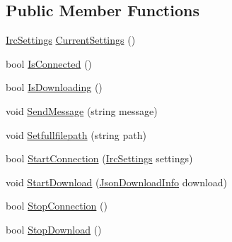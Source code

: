 \subsection*{Public Member Functions}
\begin{DoxyCompactItemize}
\item 
\mbox{\hyperlink{class_little_weeb_library_1_1_settings_1_1_irc_settings}{Irc\+Settings}} \mbox{\hyperlink{interface_little_weeb_library_1_1_handlers_1_1_i_irc_client_handler_af27269f6df01227345fc51030e702b51}{Current\+Settings}} ()
\item 
bool \mbox{\hyperlink{interface_little_weeb_library_1_1_handlers_1_1_i_irc_client_handler_ae2c21ca5104d4aaceeccd1268e0d52b2}{Is\+Connected}} ()
\item 
bool \mbox{\hyperlink{interface_little_weeb_library_1_1_handlers_1_1_i_irc_client_handler_abb1d62bc52436a68712fd1b80d9f911e}{Is\+Downloading}} ()
\item 
void \mbox{\hyperlink{interface_little_weeb_library_1_1_handlers_1_1_i_irc_client_handler_aa9da8681f056b8122ad56c586a78fed0}{Send\+Message}} (string message)
\item 
void \mbox{\hyperlink{interface_little_weeb_library_1_1_handlers_1_1_i_irc_client_handler_a060949c5d049dd8a06c0ef672b4d4fad}{Setfullfilepath}} (string path)
\item 
bool \mbox{\hyperlink{interface_little_weeb_library_1_1_handlers_1_1_i_irc_client_handler_a0a814a058f665efda8c88eb5306658f5}{Start\+Connection}} (\mbox{\hyperlink{class_little_weeb_library_1_1_settings_1_1_irc_settings}{Irc\+Settings}} settings)
\item 
void \mbox{\hyperlink{interface_little_weeb_library_1_1_handlers_1_1_i_irc_client_handler_af14486a1ffa0b1d4ab3058f442ee9d6a}{Start\+Download}} (\mbox{\hyperlink{class_little_weeb_library_1_1_models_1_1_json_download_info}{Json\+Download\+Info}} download)
\item 
bool \mbox{\hyperlink{interface_little_weeb_library_1_1_handlers_1_1_i_irc_client_handler_a2b673db5262a09a26d72ee57e34e5b60}{Stop\+Connection}} ()
\item 
bool \mbox{\hyperlink{interface_little_weeb_library_1_1_handlers_1_1_i_irc_client_handler_af1da0e6ed40f306b92dc0952c05cd1fe}{Stop\+Download}} ()
\end{DoxyCompactItemize}
